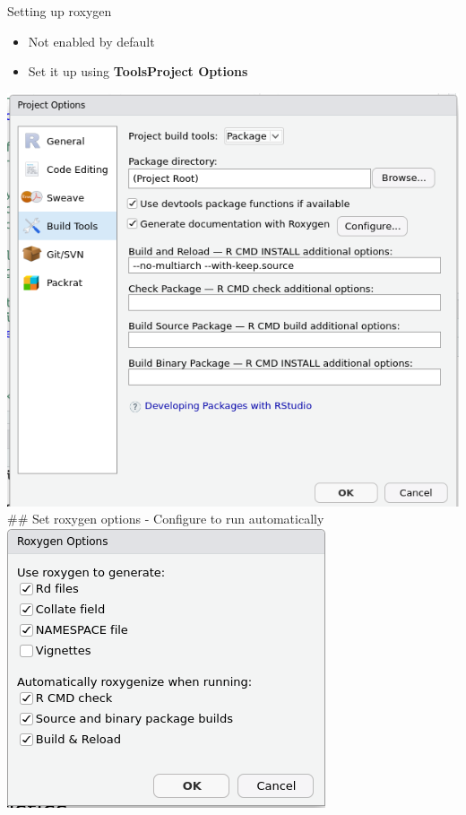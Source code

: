 \documentclass[
  ignorenonframetext,
  aspectratio=169]{beamer}
\providecommand{\tightlist}{%
  \setlength{\itemsep}{0pt}\setlength{\parskip}{0pt}}
\begin{document}
\begin{frame}{Setting up roxygen}
\protect\hypertarget{setting-up-roxygen}{}
\begin{itemize}
\tightlist
\item
  Not enabled by default
\item
  Set it up using \textbf{Tools\textbar Project Options}
\end{itemize}

\includegraphics{figures/project_options.png} \#\# Set roxygen options -
Configure to run automatically\\
\includegraphics{figures/roxygen_options.png}
\end{frame}
\end{document}
